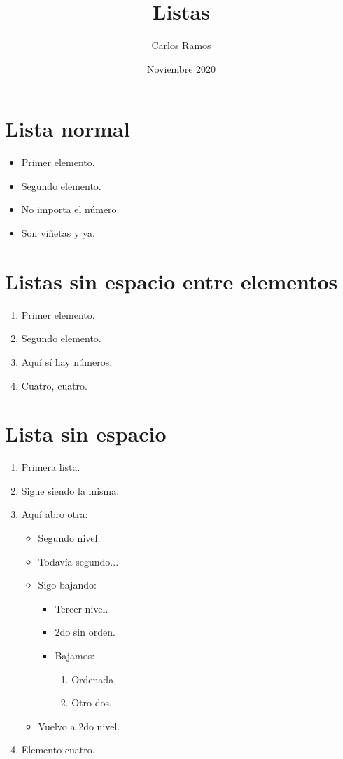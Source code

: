 \documentclass{article}
\title{Listas}
\author{Carlos Ramos}
\date{Noviembre 2020}
\begin{document}
\maketitle

\section{Lista normal}

\lipsum[1]

\begin{itemize}
	\item Primer elemento.
	\item Segundo elemento.
	\item No importa el número.
	\item Son viñetas y ya.
\end{itemize}

\lipsum[1]

\section{Listas sin espacio entre elementos}

\lipsum[1]

\begin{enumerate}[noitemsep]
	\item Primer elemento.
	\item Segundo elemento.
	\item Aquí sí hay números.
	\item Cuatro, cuatro.
\end{enumerate}

\lipsum[1]

\section{Lista sin espacio}

\lipsum[1]

\begin{enumerate}[nosep]
	\item Primera lista.
	\item Sigue siendo la misma.
	\item Aquí abro otra:
	\begin{itemize}
		\item Segundo nivel.
		\item Todavía segundo...
		\item Sigo bajando:
		\begin{itemize}
			\item Tercer nivel.
			\item 2do sin orden.
			\item Bajamos:
			\begin{enumerate}
				\item Ordenada.
				\item Otro dos.
			\end{enumerate}
		\end{itemize}
		\item Vuelvo a 2do nivel.
	\end{itemize}
	\item Elemento cuatro.
\end{enumerate}

\lipsum[1]
\end{document}
